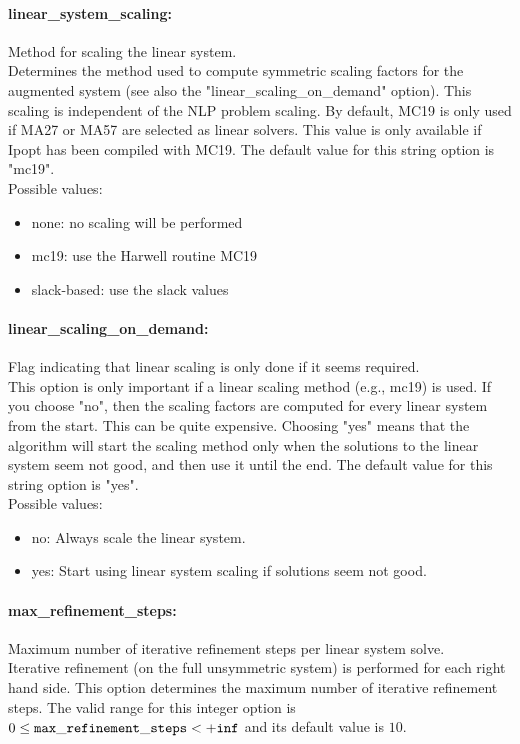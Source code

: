 \paragraph{linear\_system\_scaling:}\label{opt:linear_system_scaling} Method for scaling the linear system. \\
 Determines the method used to compute symmetric scaling factors for the augmented system (see also the "linear\_scaling\_on\_demand" option).  This scaling is independent of the NLP problem scaling.  By default, MC19 is only used if MA27 or MA57 are selected as linear solvers. This value is only available if Ipopt has been compiled with MC19. The default value for this string option is "mc19".
\\ 
Possible values:
\begin{itemize}
   \item none: no scaling will be performed
   \item mc19: use the Harwell routine MC19
   \item slack-based: use the slack values
\end{itemize}

\paragraph{linear\_scaling\_on\_demand:}\label{opt:linear_scaling_on_demand} Flag indicating that linear scaling is only done if it seems required. \\
 This option is only important if a linear scaling method (e.g., mc19) is used.  If you choose "no", then the scaling factors are computed for every linear system from the start.  This can be quite expensive. Choosing "yes" means that the algorithm will start the scaling method only when the solutions to the linear system seem not good, and then use it until the end. The default value for this string option is "yes".
\\ 
Possible values:
\begin{itemize}
   \item no: Always scale the linear system.
   \item yes: Start using linear system scaling if solutions seem not good.
\end{itemize}

\paragraph{max\_refinement\_steps:}\label{opt:max_refinement_steps} Maximum number of iterative refinement steps per linear system solve. \\
 Iterative refinement (on the full unsymmetric system) is performed for each right hand side.  This option determines the maximum number of iterative refinement steps. The valid range for this integer option is
$0 \le {\tt max\_refinement\_steps } <  {\tt +inf}$
and its default value is $10$.


